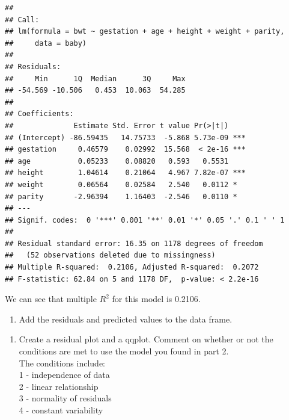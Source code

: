 \documentclass[]{article}
\newenvironment{Shaded}{\begin{snugshade}}{\end{snugshade}}
\newcommand{\KeywordTok}[1]{\textcolor[rgb]{0.13,0.29,0.53}{\textbf{#1}}}
\newcommand{\NormalTok}[1]{#1}
\newcommand{\OperatorTok}[1]{\textcolor[rgb]{0.81,0.36,0.00}{\textbf{#1}}}
\newcommand{\StringTok}[1]{\textcolor[rgb]{0.31,0.60,0.02}{#1}}
\providecommand{\tightlist}{%
  \setlength{\itemsep}{0pt}\setlength{\parskip}{0pt}}
\begin{document}
\begin{verbatim}
## 
## Call:
## lm(formula = bwt ~ gestation + age + height + weight + parity, 
##     data = baby)
## 
## Residuals:
##     Min      1Q  Median      3Q     Max 
## -54.569 -10.506   0.453  10.063  54.285 
## 
## Coefficients:
##              Estimate Std. Error t value Pr(>|t|)    
## (Intercept) -86.59435   14.75733  -5.868 5.73e-09 ***
## gestation     0.46579    0.02992  15.568  < 2e-16 ***
## age           0.05233    0.08820   0.593   0.5531    
## height        1.04614    0.21064   4.967 7.82e-07 ***
## weight        0.06564    0.02584   2.540   0.0112 *  
## parity       -2.96394    1.16403  -2.546   0.0110 *  
## ---
## Signif. codes:  0 '***' 0.001 '**' 0.01 '*' 0.05 '.' 0.1 ' ' 1
## 
## Residual standard error: 16.35 on 1178 degrees of freedom
##   (52 observations deleted due to missingness)
## Multiple R-squared:  0.2106, Adjusted R-squared:  0.2072 
## F-statistic: 62.84 on 5 and 1178 DF,  p-value: < 2.2e-16
\end{verbatim}

We can see that multiple \(R^2\) for this model is 0.2106.

\newpage

\begin{enumerate}
\def\labelenumi{\arabic{enumi}.}
\setcounter{enumi}{5}
\tightlist
\item
  Add the residuals and predicted values to the data frame.
\end{enumerate}

\begin{Shaded}
\end{Shaded}

\begin{enumerate}
\def\labelenumi{\arabic{enumi}.}
\setcounter{enumi}{6}
\tightlist
\item
  Create a residual plot and a qqplot. Comment on whether or not the
  conditions are met to use the model you found in part 2.\\
  The conditions include:\\
  1 - independence of data\\
  2 - linear relationship\\
  3 - normality of residuals\\
  4 - constant variability
\end{enumerate}
\end{document}
